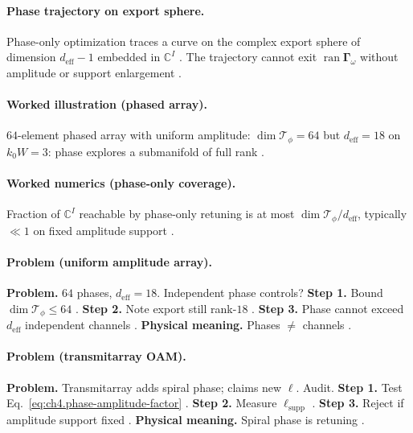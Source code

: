 \paragraph{Phase trajectory on export sphere.}
Phase-only optimization traces a curve on the complex export sphere of dimension \(d_{\mathrm{eff}}-1\) embedded in \(\mathbb{C}^{I}\)
\cite{stratton1941,harrington2001,hansen1988,devaney2004}. The trajectory cannot exit \(\operatorname{ran}\boldsymbol{\Gamma}_\omega\) without amplitude or
support enlargement \cite{jackson1999,collin2001}.

\paragraph{Worked illustration (phased array).}
\(64\)-element phased array with uniform amplitude: \(\dim\mathcal{T}_{\phi}=64\) but \(d_{\mathrm{eff}}=18\) on \(k_{0}W=3\): phase explores a submanifold
of full rank \cite{harrington2001,collin2001,hansen1988,stratton1941,devaney2004,jackson1999}.

\paragraph{Worked numerics (phase-only coverage).}
Fraction of \(\mathbb{C}^{I}\) reachable by phase-only retuning is at most \(\dim\mathcal{T}_{\phi}/d_{\mathrm{eff}}\), typically \(\ll1\) on fixed amplitude
support \cite{harrington2001,stratton1941,hansen1988,devaney2004,collin2001}.

\paragraph{Problem (uniform amplitude array).}
\textbf{Problem.} \(64\) phases, \(d_{\mathrm{eff}}=18\). Independent phase controls?
\textbf{Step 1.} Bound \(\dim\mathcal{T}_{\phi}\le64\) \cite{harrington2001,stratton1941}.
\textbf{Step 2.} Note export still rank-\(18\) \cite{hansen1988,devaney2004}.
\textbf{Step 3.} Phase cannot exceed \(d_{\mathrm{eff}}\) independent channels \cite{jackson1999,collin2001}.
\textbf{Physical meaning.} Phases \(\neq\) channels \cite{harrington2001}.

\paragraph{Problem (transmitarray OAM).}
\textbf{Problem.} Transmitarray adds spiral phase; claims new \(\ell\). Audit.
\textbf{Step 1.} Test Eq.~\eqref{eq:ch4.phase-amplitude-factor} \cite{stratton1941,hansen1988}.
\textbf{Step 2.} Measure \(\ell_{\mathrm{supp}}\) \cite{harrington2001,jackson1999}.
\textbf{Step 3.} Reject if amplitude support fixed \cite{devaney2004,collin2001}.
\textbf{Physical meaning.} Spiral phase is retuning \cite{stratton1941}.

